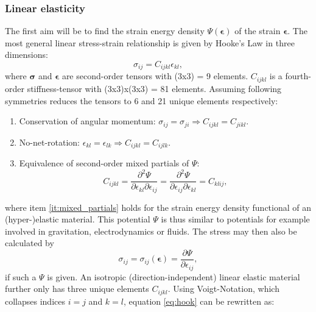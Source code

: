 \documentclass[m,times]{cgMA}
\begin{document}
\subsubsection{Linear elasticity}\label{sec:linear_elasticty}
The first aim will be to find the strain energy density $\Psi(\boldsymbol{\epsilon})$ of the strain $\bm{\epsilon}$. The most general linear stress-strain relationship is given by Hooke's Law in three dimensions:
\begin{equation}\label{eq:hook}
  \sigma_{ij} = C_{ijkl} \epsilon_{kl},
\end{equation}
where $\boldsymbol{\sigma}$ and $\bm{\epsilon}$ are second-order tensors with (3x3) = 9 elements. $C_{ijkl}$ is a fourth-order stiffness-tensor with (3x3)x(3x3) = 81 elements.
Assuming following symmetries reduces the tensors to 6 and 21 unique elements respectively:
\begin{enumerate}
  \item Conservation of angular momentum: $\sigma_{ij} = \sigma_{ji} \Rightarrow C_{ijkl} = C_{jikl}$.
  \item No-net-rotation: $\epsilon_{kl} = \epsilon_{lk} \Rightarrow C_{ijkl} = C_{ijlk}$.
  \item \label{it:mixed_partials}Equivalence of second-order mixed partials of $\Psi$:
    \begin{equation}
      C _ { i j k l } = \frac { \partial ^ { 2 } { \Psi } } { \partial \epsilon _ { k l } \partial \epsilon _ { i j } } = \frac { \partial ^ { 2 } { \Psi } } { \partial \epsilon _ { i j } \partial \epsilon _ { k l } } = C _ { k l i j },
    \end{equation}
\end{enumerate}
where item \ref{it:mixed_partials} holds for the strain energy density functional of an (hyper-)elastic material. This potential $\Psi$ is thus similar to potentials for example involved in gravitation, electrodynamics or fluids. The stress may then also be calculated by
\begin{equation}\label{eq:partial_energy}
  \sigma _ { i j } = \sigma _ { i j } ( \boldsymbol{\epsilon} ) = \frac { \partial { \Psi } } { \partial \epsilon _ { i j } },
\end{equation}
if such a $\Psi$ is given. An isotropic (direction-independent) linear elastic material further only has three unique elements $C _ {i j k l}$. Using Voigt-Notation, which collapses indices $i=j$ and $k=l$, equation \ref{eq:hook} can be rewritten as:
\end{document}
